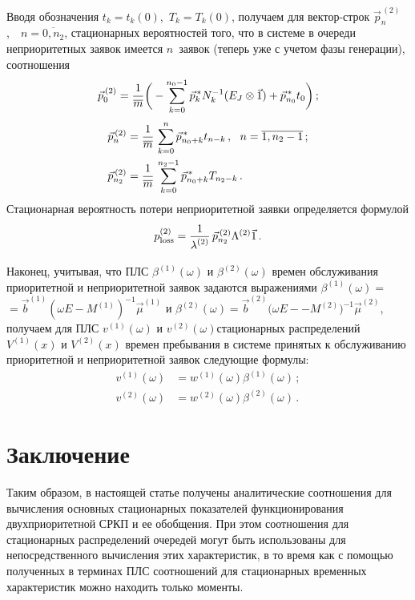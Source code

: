 \begin{multicols}{2}
Вводя обозначения $t_k=t_k(0)$,\  $T_k=T_k(0)$,
получаем для вектор-строк $\vec p^{\,(2)}_n$,\ \ $n=\overline{0,n_2}$,
стационарных вероятностей того, что в системе в очереди
неприоритетных заявок имеется $n$~заявок (теперь уже
с учетом фазы генерации), соотношения
\begin{equation*}
\vec p^{\,(2)}_0 = \displaystyle\frac{\displaystyle 1\mathstrut}{\displaystyle \overline m\mathstrut}
\bigg(
-
\sum\limits_{k=0}^{n_0-1}
\vec p^{\,*}_k N_k^{-1} (E_J\otimes\vec 1)
+
\vec p^{\,*}_{n_0} t_0
\bigg)\,;
\end{equation*}
\begin{align*}
\vec p^{\,(2)}_n &= \displaystyle\frac{\displaystyle 1\mathstrut}{\displaystyle \overline m\mathstrut}\,\sum\limits_{k=0}^{n}
\vec p^{\,*}_{n_0+k} t_{n-k}\,,
\ \ n=\overline{1,n_2-1}\,;
\\
\vec p^{\,(2)}_{n_2} &=
\displaystyle\frac{\displaystyle 1\mathstrut}{\displaystyle \overline m\mathstrut}\,\sum\limits_{k=0}^{n_2-1} \vec p^{\,*}_{n_0+k} T_{n_2-k}\,.
\end{align*}
Стационарная вероятность потери неприоритетной заявки
определяется формулой
$$
p^{(2)}_{\mathrm{loss}} = \displaystyle\frac{\displaystyle 1\mathstrut}{\displaystyle \lambda^{(2)}\mathstrut}\,
\vec p_{n_2}^{\,(2)} \Lambda^{(2)} \vec 1\,.
$$

Наконец, учитывая, что ПЛС $\beta^{(1)}(\omega)$ и
$\beta^{(2)}(\omega)$ времен обслуживания приоритетной и
неприоритетной заявок задаются выражениями
$\beta^{(1)}(\omega) =$\linebreak $= \vec b^{(1)} (\omega E - M^{(1)})^{-1} \vec\mu^{(1)}$
и
$\beta^{(2)}(\omega) = \vec b^{(2)} (\omega E -$\linebreak $- M^{(2)})^{-1} \vec\mu^{(2)}$,
получаем для ПЛС $v^{(1)}(\omega)$ и $v^{(2)}(\omega)$\linebreak стационарных
распределений $V^{(1)}(x)$ и $V^{(2)}(x)$ времен пребывания в системе
принятых к обслуживанию приоритетной и неприоритетной заявок следующие
формулы:
\begin{align*}
v^{(1)}(\omega) &=
w^{(1)}(\omega) \beta^{(1)}(\omega)\,;
\\
v^{(2)}(\omega) &=
w^{(2)}(\omega) \beta^{(2)}(\omega)\,.
\end{align*}

\section{Заключение}

Таким образом, в настоящей статье получены аналитические соотношения
для вычисления основных стационарных показателей функционирования
двухприоритетной СРКП и ее обобщения.
При этом соотношения для стационарных распределений очередей могут
быть использованы для непосредственного вычисления этих характеристик,
в то время как с помощью полученных в терминах ПЛС соотношений
для стационарных временных характеристик можно находить только
моменты.


\end{multicols}
